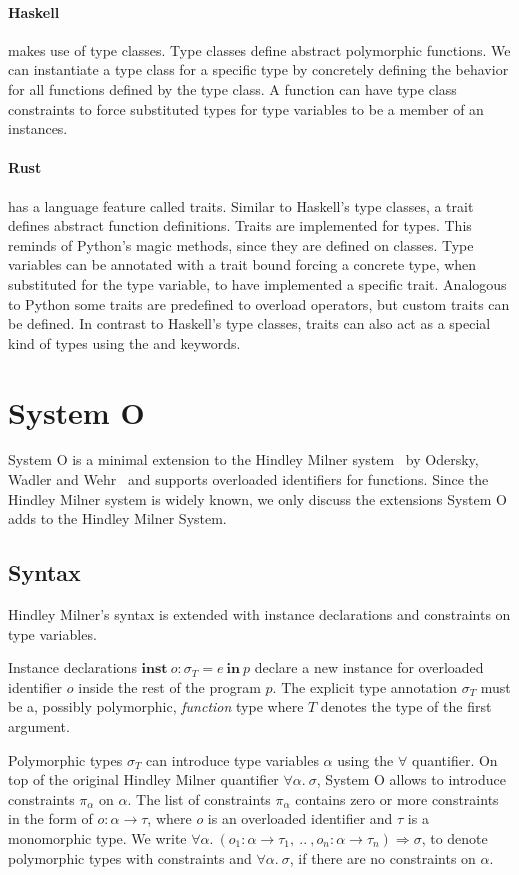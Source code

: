 \documentclass[runningheads]{llncs}
\newcommand{\snip}[1]{\footnotesize{\ttfamily{#1}}}
\begin{document}
\paragraph{Haskell} makes use of type classes. 
Type classes define abstract polymorphic functions. 
We can instantiate a type class for a specific type by concretely defining the behavior for all functions defined by the type class. 
A function can have type class constraints to force substituted types for type variables to be a member of an instances. 
\paragraph{Rust} has a language feature called traits. Similar to Haskell's type classes, a trait defines abstract function definitions. 
Traits are implemented for types. This reminds of Python's magic methods, since they are defined on classes.
Type variables can be annotated with a trait bound forcing a concrete type, when substituted for the type variable, to have implemented a specific trait. 
Analogous to Python some traits are predefined to overload operators, but custom traits can be defined. 
In contrast to Haskell's type classes, traits can also act as a special kind of types using the \snip{dyn} and \snip{impl} keywords.

\section{System O}
System O is a minimal extension to the Hindley Milner system~\cite{hm78} by Odersky, Wadler and Wehr~\cite{oww95} and supports overloaded identifiers for functions. 
Since the Hindley Milner system is widely known, we only discuss the extensions System O adds to the Hindley Milner System. 
\subsection{Syntax}
Hindley Milner's syntax is extended with instance declarations and constraints on type variables.

Instance declarations $\textbf{inst} \ o : \sigma_T = e \ \textbf{in} \ p$ declare a new instance for overloaded identifier $o$ inside the rest of the program $p$. 
The explicit type annotation $\sigma_T$ must be a, possibly polymorphic, \emph{function} type where $T$ denotes the type of the first argument. 

Polymorphic types $\sigma_T$ can introduce type variables $\alpha$ using the $\forall$ quantifier. 
On top of the original Hindley Milner quantifier $\forall \alpha. \ \sigma$, System O allows to introduce constraints $\pi_\alpha$ on $\alpha$. 
The list of constraints $\pi_\alpha$ contains zero or more constraints in the form of $o : \alpha \rightarrow \tau$, where $o$ is an overloaded identifier and $\tau$ is a monomorphic type.
We write $\forall \alpha. \ (o_1 : \alpha \rightarrow \tau_1, \ .. \ , o_n : \alpha \rightarrow \tau_n) \Rightarrow \sigma$, to denote polymorphic types with constraints and $\forall \alpha. \ \sigma$, if there are no constraints on $\alpha$. 
\end{document}
